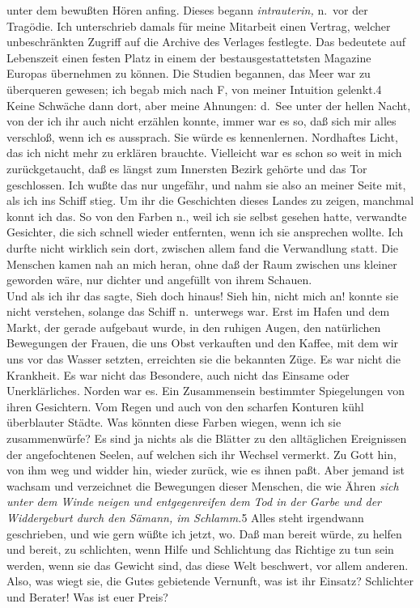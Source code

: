 \documentclass[
]{article}
\begin{document}
unter dem bewußten Hören anfing. Dieses begann \emph{intrauterin,}
n.~vor der Tragödie. Ich unterschrieb damals für meine Mitarbeit einen
Vertrag, welcher unbeschränkten Zugriff auf die Archive des Verlages
festlegte. Das bedeutete auf Lebenszeit einen festen Platz in einem der
bestausgestattetsten Magazine Europas übernehmen zu können. Die Studien
begannen, das Meer war zu überqueren gewesen; ich begab mich nach F, von
meiner Intuition gelenkt.4\\
Keine Schwäche dann dort, aber meine Ahnungen: d.~See unter der hellen
Nacht, von der ich ihr auch nicht erzählen konnte, immer war es so, daß
sich mir alles verschloß, wenn ich es aussprach. Sie würde es
kennenlernen. Nordhaftes Licht, das ich nicht mehr zu erklären brauchte.
Vielleicht war es schon so weit in mich zurückgetaucht, daß es längst
zum Innersten Bezirk gehörte und das Tor geschlossen. Ich wußte das nur
ungefähr, und nahm sie also an meiner Seite mit, als ich ins Schiff
stieg. Um ihr die Geschichten dieses Landes zu zeigen, manchmal konnt
ich das. So von den Farben n., weil ich sie selbst gesehen hatte,
verwandte Gesichter, die sich schnell wieder entfernten, wenn ich sie
ansprechen wollte. Ich durfte nicht wirklich sein dort, zwischen allem
fand die Verwandlung statt. Die Menschen kamen nah an mich heran, ohne
daß der Raum zwischen uns kleiner geworden wäre, nur dichter und
angefüllt von ihrem Schauen.\\
Und als ich ihr das sagte, Sieh doch hinaus! Sieh hin, nicht mich an!
konnte sie nicht verstehen, solange das Schiff n.~unterwegs war. Erst im
Hafen und dem Markt, der gerade aufgebaut wurde, in den ruhigen Augen,
den natürlichen Bewegungen der Frauen, die uns Obst verkauften und den
Kaffee, mit dem wir uns vor das Wasser setzten, erreichten sie die
bekannten Züge. Es war nicht die Krankheit. Es war nicht das Besondere,
auch nicht das Einsame oder Unerklärliches. Norden war es. Ein
Zusammensein bestimmter Spiegelungen von ihren Gesichtern. Vom Regen und
auch von den scharfen Konturen kühl überblauter Städte. Was könnten
diese Farben wiegen, wenn ich sie zusammenwürfe? Es sind ja nichts als
die Blätter zu den alltäglichen Ereignissen der angefochtenen Seelen,
auf welchen sich ihr Wechsel vermerkt. Zu Gott hin, von ihm weg und
widder hin, wieder zurück, wie es ihnen paßt. Aber jemand ist wachsam
und verzeichnet die Bewegungen dieser Menschen, die wie Ähren \emph{sich
unter dem Winde neigen und entgegenreifen dem Tod in der Garbe und der
Widdergeburt durch den Sämann, im Schlamm.}5 Alles steht irgendwann
geschrieben, und wie gern wüßte ich jetzt, wo. Daß man bereit würde, zu
helfen und bereit, zu schlichten, wenn Hilfe und Schlichtung das
Richtige zu tun sein werden, wenn sie das Gewicht sind, das diese Welt
beschwert, vor allem anderen. Also, was wiegt sie, die Gutes gebietende
Vernunft, was ist ihr Einsatz? Schlichter und Berater! Was ist euer
Preis?
\end{document}
